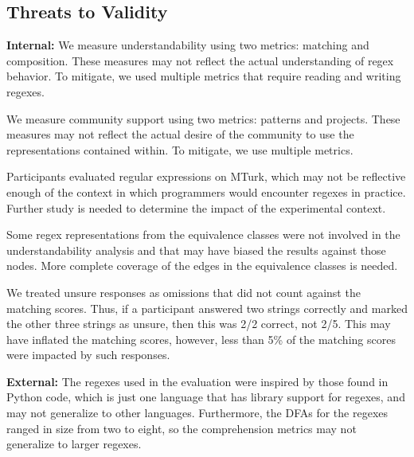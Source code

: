 \subsection{Threats to Validity}

\textbf{Internal:}
We measure understandability using two metrics: matching and composition. These measures may not reflect the actual understanding of regex behavior. To mitigate, we used multiple metrics that require reading and writing regexes. %

We measure community support using two metrics: patterns and projects. These measures may not reflect the actual desire of the community to use the representations contained within. To mitigate, we use multiple metrics.

Participants evaluated regular expressions on MTurk, which may not be reflective enough of the context in which programmers would encounter regexes in practice. Further study is needed to determine the impact of the experimental context.

Some regex representations from the equivalence classes were not involved in the understandability analysis and that may have biased the results against those nodes.
More complete coverage of the edges in the equivalence classes is needed.

We treated unsure responses as omissions that did not count against the matching scores. Thus, if a participant answered two strings correctly and marked the other three strings as unsure, then this was 2/2 correct, not 2/5. This may have inflated the matching scores, however, less than 5\% of the matching scores were impacted by such responses.





%

\textbf{External:}
The regexes used in the evaluation were inspired by those found in Python code, which is just one language that has library support for regexes, and may not generalize to other languages. %
Furthermore, the DFAs for the regexes ranged in size from two to eight, so the comprehension metrics may not generalize to larger regexes.%

